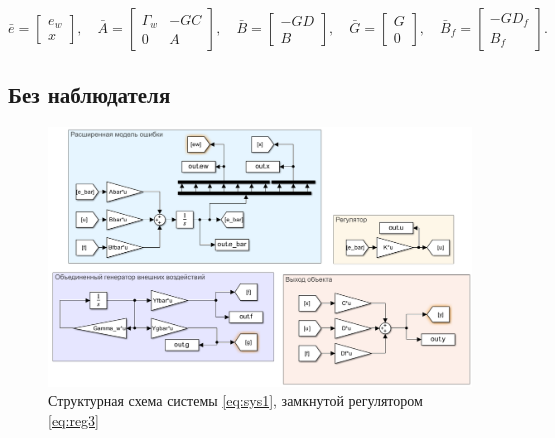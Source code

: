 \begin{equation*}
    \bar e=\begin{bmatrix}
        e_w\\x
    \end{bmatrix},\quad
    \bar A=\begin{bmatrix}
        \Gamma_w&-GC\\0&A
    \end{bmatrix},\quad
    \bar B=\begin{bmatrix}
        -GD\\B
    \end{bmatrix},\quad
    \bar G=\begin{bmatrix}
        G\\0
    \end{bmatrix},\quad
    \bar B_f=\begin{bmatrix}
        -GD_f\\B_f
    \end{bmatrix}.
\end{equation*}



\subsection{Без наблюдателя}

\begin{figure}[H]
    \centering
    \includegraphics[width=\linewidth]{figs/3_0_slx.png}
    \caption{Структурная схема системы \eqref{eq:sys1}, замкнутой регулятором
    \eqref{eq:reg3}}
    \label{fig:30slx}
\end{figure}

